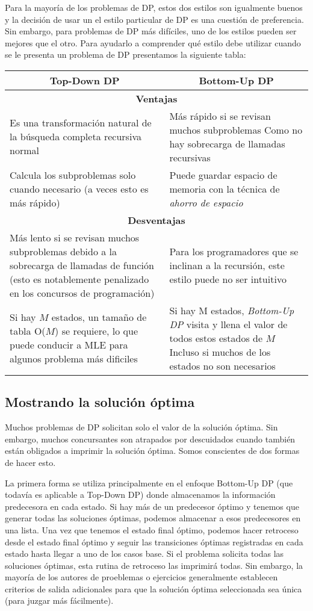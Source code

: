 Para la mayoría de los problemas de DP, estos dos estilos son igualmente buenos y la decisión de usar un el estilo particular de DP es una cuestión de preferencia. Sin embargo, para problemas de DP más difíciles, uno de los estilos pueden ser mejores que el otro. Para ayudarlo a comprender qué estilo debe utilizar cuando se le presenta un problema de DP presentamos la siguiente tabla:

\begin{longtable}{|p{7.5cm}|p{7.5cm}|}
	\hline
\multicolumn{1}{|c|}{\textbf{Top-Down DP}}	&  \multicolumn{1}{|c|}{\textbf{Bottom-Up DP}} \\
	\hline
\multicolumn{2}{|c|}{\textbf{Ventajas}}	  \\
	\hline
Es una transformación natural de la búsqueda completa recursiva normal	& Más rápido si se revisan muchos subproblemas
Como no hay sobrecarga de llamadas recursivas  \\
	\hline
Calcula los subproblemas solo cuando
necesario (a veces esto es más rápido)	& Puede guardar espacio de memoria con la técnica de \emph{ahorro de espacio} \\
	\hline
\multicolumn{2}{|c|}{\textbf{Desventajas}} \\
	\hline
Más lento si se revisan muchos subproblemas debido a la sobrecarga de llamadas de función (esto es notablemente penalizado en los concursos de programación)	&  Para los programadores que se inclinan a la recursión, este estilo puede no ser intuitivo \\
	\hline
Si hay $M$ estados, un tamaño de tabla O($M$)
se requiere, lo que puede conducir a MLE para algunos
problema más dificiles	& Si hay M estados, \emph{Bottom-Up DP}
visita y llena el valor de todos estos estados de $M$
Incluso si muchos de los estados no son necesarios \\
	\hline
\end{longtable}

\subsection{Mostrando la solución óptima}

Muchos problemas de DP solicitan solo el valor de la solución óptima. Sin embargo, muchos concursantes son atrapados por descuidados cuando también están obligados a imprimir la solución óptima. Somos conscientes de dos formas de hacer esto.

La primera forma se utiliza principalmente en el enfoque Bottom-Up DP (que todavía es aplicable a Top-Down DP) donde almacenamos la información predecesora en cada estado. Si hay más de un predecesor óptimo y tenemos que generar todas las soluciones óptimas, podemos almacenar a esos predecesores en una lista. Una vez que tenemos el estado final óptimo, podemos hacer retroceso desde el estado final óptimo y seguir las transiciones óptimas registradas en cada estado hasta llegar a uno de los casos base. Si el problema solicita todas las soluciones óptimas, esta rutina de retroceso las imprimirá todas. Sin embargo, la mayoría de los autores de proeblemas o ejercicios generalmente establecen criterios de salida adicionales para que la solución óptima seleccionada sea única (para juzgar más fácilmente).

